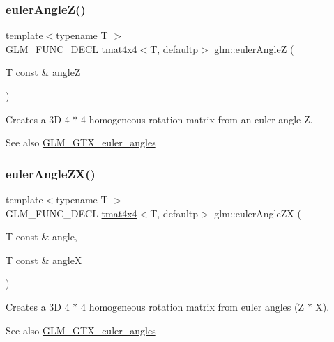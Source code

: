 \subsubsection{\texorpdfstring{euler\+Angle\+Z()}{eulerAngleZ()}}
{\footnotesize\ttfamily template$<$typename T $>$ \\
G\+L\+M\+\_\+\+F\+U\+N\+C\+\_\+\+D\+E\+CL \hyperlink{structglm_1_1tmat4x4}{tmat4x4}$<$T, defaultp$>$ glm\+::euler\+AngleZ (\begin{DoxyParamCaption}\item[{T const \&}]{angleZ }\end{DoxyParamCaption})}

Creates a 3D 4 $\ast$ 4 homogeneous rotation matrix from an euler angle Z. \begin{DoxySeeAlso}{See also}
\hyperlink{group__gtx__euler__angles}{G\+L\+M\+\_\+\+G\+T\+X\+\_\+euler\+\_\+angles} 
\end{DoxySeeAlso}
\mbox{\label{group__gtx__euler__angles_gaef83cf40bd9ae780011b29970f16f622}} 
\subsubsection{\texorpdfstring{euler\+Angle\+Z\+X()}{eulerAngleZX()}}
{\footnotesize\ttfamily template$<$typename T $>$ \\
G\+L\+M\+\_\+\+F\+U\+N\+C\+\_\+\+D\+E\+CL \hyperlink{structglm_1_1tmat4x4}{tmat4x4}$<$T, defaultp$>$ glm\+::euler\+Angle\+ZX (\begin{DoxyParamCaption}\item[{T const \&}]{angle,  }\item[{T const \&}]{angleX }\end{DoxyParamCaption})}

Creates a 3D 4 $\ast$ 4 homogeneous rotation matrix from euler angles (Z $\ast$ X). \begin{DoxySeeAlso}{See also}
\hyperlink{group__gtx__euler__angles}{G\+L\+M\+\_\+\+G\+T\+X\+\_\+euler\+\_\+angles} 
\end{DoxySeeAlso}
\mbox{\label{group__gtx__euler__angles_ga02f037926568bbd12dfece3b28b20343}} 
